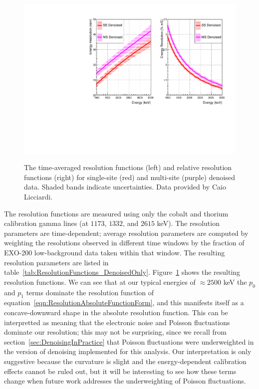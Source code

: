 \begin{figure}
\begin{center}
\includegraphics[keepaspectratio=true,width=\textwidth]{ResolutionDenoisedOnly.pdf}
\end{center}
\renewcommand{\baselinestretch}{1}
\small\normalsize
\begin{quote}
\caption{The time-averaged resolution functions (left) and relative resolution functions (right) for single-site (red) and multi-site (purple) denoised data.  Shaded bands indicate uncertainties.  Data provided by Caio Licciardi.}
\label{fig:ResolutionFunctionComparison_DenoisedOnly}
\end{quote}
\end{figure}
\renewcommand{\baselinestretch}{2}
\small\normalsize

The resolution functions are measured using only the cobalt and thorium calibration gamma lines (at $1173$, $1332$, and $2615$ keV).  The resolution parameters are time-dependent; average resolution parameters are computed by weighting the resolutions observed in different time windows by the fraction of EXO-200 low-background data taken within that window.  The resulting resolution parameters are listed in table~\ref{tab:ResolutionFunctions_DenoisedOnly}.  Figure~\ref{fig:ResolutionFunctionComparison_DenoisedOnly} shows the resulting resolution functions.  We can see that at our typical energies of $\approx 2500$ keV the $p_0$ and $p_1$ terms dominate the resolution function of equation~\ref{eqn:ResolutionAbsoluteFunctionForm}, and this manifests itself as a concave-downward shape in the absolute resolution function.  This can be interpretted as meaning that the electronic noise and Poisson fluctuations dominate our resolution; this may not be surprising, since we recall from section~\ref{sec:DenoisingInPractice} that Poisson fluctuations were underweighted in the version of denoising implemented for this analysis.  Our interpretation is only suggestive because the curvature is slight and the energy-dependent calibration effects cannot be ruled out, but it will be interesting to see how these terms change when future work addresses the underweighting of Poisson fluctuations.

